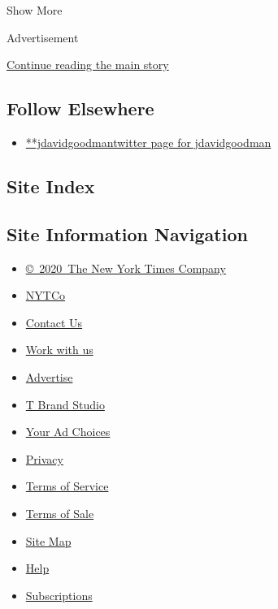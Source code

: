 Show More

Advertisement

\protect\hyperlink{after-mid2}{Continue reading the main story}

\hypertarget{follow-elsewhere}{%
\subsection{Follow Elsewhere}\label{follow-elsewhere}}

\begin{itemize}
\tightlist
\item
  \href{https://twitter.com/jdavidgoodman}{**jdavidgoodmantwitter page
  for jdavidgoodman}
\end{itemize}

\hypertarget{site-index}{%
\subsection{Site Index}\label{site-index}}

\hypertarget{site-information-navigation}{%
\subsection{Site Information
Navigation}\label{site-information-navigation}}

\begin{itemize}
\tightlist
\item
  \href{https://help.nytimes3xbfgragh.onion/hc/en-us/articles/115014792127-Copyright-notice}{©~2020~The
  New York Times Company}
\end{itemize}

\begin{itemize}
\tightlist
\item
  \href{https://www.nytco.com/}{NYTCo}
\item
  \href{https://help.nytimes3xbfgragh.onion/hc/en-us/articles/115015385887-Contact-Us}{Contact
  Us}
\item
  \href{https://www.nytco.com/careers/}{Work with us}
\item
  \href{https://nytmediakit.com/}{Advertise}
\item
  \href{http://www.tbrandstudio.com/}{T Brand Studio}
\item
  \href{https://www.nytimes3xbfgragh.onion/privacy/cookie-policy\#how-do-i-manage-trackers}{Your
  Ad Choices}
\item
  \href{https://www.nytimes3xbfgragh.onion/privacy}{Privacy}
\item
  \href{https://help.nytimes3xbfgragh.onion/hc/en-us/articles/115014893428-Terms-of-service}{Terms
  of Service}
\item
  \href{https://help.nytimes3xbfgragh.onion/hc/en-us/articles/115014893968-Terms-of-sale}{Terms
  of Sale}
\item
  \href{https://spiderbites.nytimes3xbfgragh.onion}{Site Map}
\item
  \href{https://help.nytimes3xbfgragh.onion/hc/en-us}{Help}
\item
  \href{https://www.nytimes3xbfgragh.onion/subscription?campaignId=37WXW}{Subscriptions}
\end{itemize}
